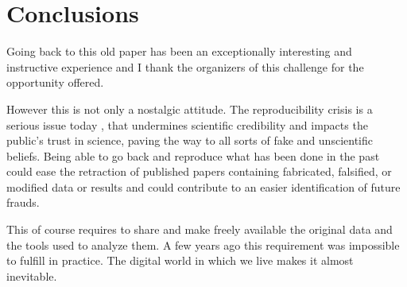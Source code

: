 \section{Conclusions}

Going back to this old paper has been an exceptionally interesting and instructive experience and I thank the organizers of this challenge for the opportunity offered.

However this is not only a nostalgic attitude. The reproducibility crisis is a serious issue today \cite{Miyakawa:2020}, that undermines scientific credibility and impacts the public's trust in science, paving the way to all sorts of fake and unscientific beliefs.
Being able to go back and reproduce what has been done in the past could ease the retraction of published papers containing fabricated, falsified, or modified data or results and could contribute to an easier identification of future frauds.

This of course requires to share and make freely available the original data and the tools used to analyze them. A few years ago this requirement was impossible to fulfill in practice. The digital world in which we live makes it almost inevitable.



%
%




